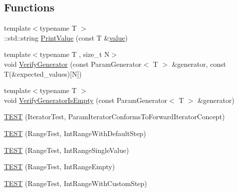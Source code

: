 \subsection*{Functions}
\begin{DoxyCompactItemize}
\item 
{\footnotesize template$<$typename T $>$ }\\\+::std\+::string \mbox{\hyperlink{_obj__test_2lib_2googletest-master_2googletest_2test_2googletest-param-test-test_8cc_a4f874f103b3979e50bc676c7f6414dfc}{Print\+Value}} (const T \&\mbox{\hyperlink{_obj__test_2lib_2googletest-master_2googlemock_2test_2gmock-matchers__test_8cc_a337b8a670efc0b086ad3af163f3121b6}{value}})
\item 
{\footnotesize template$<$typename T , size\+\_\+t N$>$ }\\void \mbox{\hyperlink{_obj__test_2lib_2googletest-master_2googletest_2test_2googletest-param-test-test_8cc_a11c99cfbf44746868aa44105130887f7}{Verify\+Generator}} (const Param\+Generator$<$ T $>$ \&generator, const T(\&expected\+\_\+values)\mbox{[}N\mbox{]})
\item 
{\footnotesize template$<$typename T $>$ }\\void \mbox{\hyperlink{_obj__test_2lib_2googletest-master_2googletest_2test_2googletest-param-test-test_8cc_a85d74de6e554738555812410476b4eec}{Verify\+Generator\+Is\+Empty}} (const Param\+Generator$<$ T $>$ \&generator)
\item 
\mbox{\hyperlink{_obj__test_2lib_2googletest-master_2googletest_2test_2googletest-param-test-test_8cc_a884488b4ac035aaa0e1f799243479538}{T\+E\+ST}} (Iterator\+Test, Param\+Iterator\+Conforms\+To\+Forward\+Iterator\+Concept)
\item 
\mbox{\hyperlink{_obj__test_2lib_2googletest-master_2googletest_2test_2googletest-param-test-test_8cc_aa1294eff6c7aea20468f93a70e6b157d}{T\+E\+ST}} (Range\+Test, Int\+Range\+With\+Default\+Step)
\item 
\mbox{\hyperlink{_obj__test_2lib_2googletest-master_2googletest_2test_2googletest-param-test-test_8cc_acce71b74b2d6f3c2d456e37fd62769a9}{T\+E\+ST}} (Range\+Test, Int\+Range\+Single\+Value)
\item 
\mbox{\hyperlink{_obj__test_2lib_2googletest-master_2googletest_2test_2googletest-param-test-test_8cc_a905a71adae7909d42426aa13b7da5ede}{T\+E\+ST}} (Range\+Test, Int\+Range\+Empty)
\item 
\mbox{\hyperlink{_obj__test_2lib_2googletest-master_2googletest_2test_2googletest-param-test-test_8cc_a806821fc992661b6da02005f57482fd8}{T\+E\+ST}} (Range\+Test, Int\+Range\+With\+Custom\+Step)

\end{DoxyCompactItemize}
